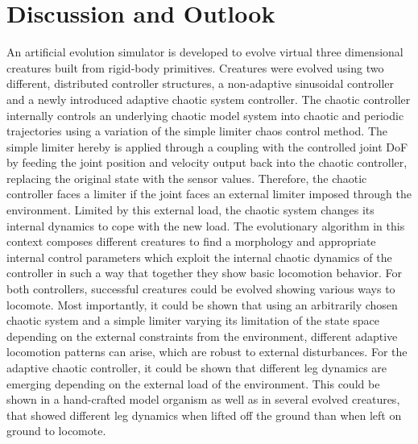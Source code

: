 \documentclass[main]{subfiles}
\begin{document}
\setcounter{chapter}{4}

\chapter{Discussion and Outlook} %

\label{Chapter\thechapter} %


An artificial evolution simulator is developed to evolve virtual three dimensional creatures built from rigid-body primitives. %
%
Creatures were evolved using two different, distributed controller structures, a non-adaptive sinusoidal controller and a newly introduced adaptive chaotic system controller. %
%
The chaotic controller internally controls an underlying chaotic model system into chaotic and periodic trajectories using a variation of the simple limiter chaos control method. %
%
The simple limiter hereby is applied through a coupling with the controlled joint DoF by feeding the joint position and velocity output back into the chaotic controller, replacing the original state with the sensor values. %
%
Therefore, the chaotic controller faces a limiter if the joint faces an external limiter imposed through the environment. %
%
Limited by this external load, the chaotic system changes its internal dynamics to cope with the new load. %
%
The evolutionary algorithm in this context composes different creatures to find a morphology and appropriate internal control parameters which exploit the internal chaotic dynamics of the controller in such a way that together they show basic locomotion behavior. %
%
For both controllers, successful creatures could be evolved showing various ways to locomote. %
%
Most importantly, it could be shown that using an arbitrarily chosen chaotic system and a simple limiter varying its limitation of the state space depending on the external constraints from the environment, different adaptive locomotion patterns can arise, which are robust to external disturbances. %
%
For the adaptive chaotic controller, it could be shown that different leg dynamics are emerging depending on the external load of the environment. %
%
This could be shown in a hand-crafted model organism as well as in several evolved creatures, that showed different leg dynamics when lifted off the ground than when left on ground to locomote. %
\end{document}
